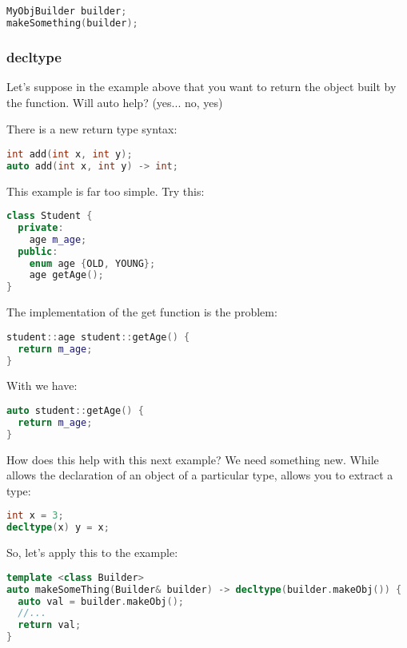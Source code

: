 \begin{lstlisting}[language=C++]
MyObjBuilder builder;
makeSomething(builder);
\end{lstlisting}


\subsubsection{decltype}

Let's suppose in the example above that you want to return the object built by the function. Will auto help? (yes... no, yes)

There is a new return type syntax:

\begin{lstlisting}[language=C++]
int add(int x, int y);
auto add(int x, int y) -> int;
\end{lstlisting}

This example is far too simple. Try this:

\begin{lstlisting}[language=C++]
class Student {
  private:
    age m_age;
  public: 
    enum age {OLD, YOUNG};
    age getAge();  
}
\end{lstlisting}

The implementation of the get function is the problem:

\begin{lstlisting}[language=C++]
student::age student::getAge() {
  return m_age;
}
\end{lstlisting}


With  we have:

\begin{lstlisting}[language=C++]
auto student::getAge() {
  return m_age;
}
\end{lstlisting}

How does this help with this next example? We need something new. While  allows the declaration of an object of a particular type,  allows you to extract a type:

\begin{lstlisting}[language=C++]
int x = 3;
decltype(x) y = x;
\end{lstlisting}

So, let's apply this to the example:

\begin{lstlisting}[language=C++]
template <class Builder>
auto makeSomeThing(Builder& builder) -> decltype(builder.makeObj()) {
  auto val = builder.makeObj();
  //...
  return val;
}
\end{lstlisting}

